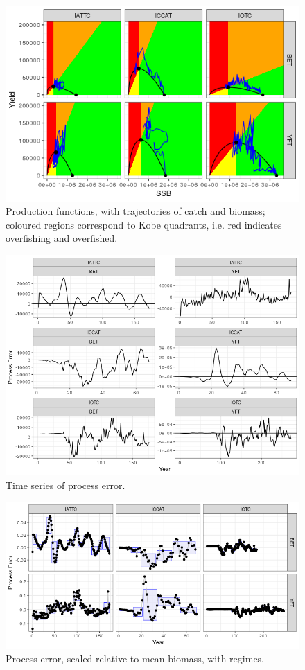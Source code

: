 \documentclass[12pt,doublespacing,a4paper]{ouparticle}
\begin{document}
\newpage
\begin{figure}[h]
\centering
\includegraphics[width=\textwidth]{pe-pf2-1.png}
\caption{Production functions, with trajectories of catch and biomass; coloured regions correspond to Kobe quadrants, i.e. red indicates overfishing and overfished.}
\label{fig:pf}
\end{figure}


\newpage
\begin{figure}[h]
\centering
\includegraphics[width=\textwidth]{pe-pe-1.png}
\caption{Time series of process error.}
\label{fig:pe}
\end{figure}


\newpage
\begin{figure}[h]
\centering
\includegraphics[width=\textwidth]{pe-pe2-1.png}
\caption{Process error, scaled relative to mean biomass, with regimes.}
\label{fig:pe2}
\end{figure}
\end{document}

